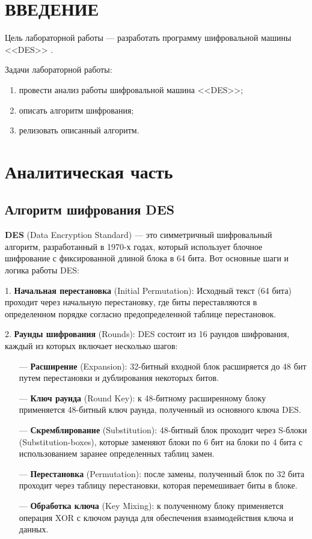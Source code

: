 \section*{\large{ВВЕДЕНИЕ}}

Цель лабораторной работы --- разработать программу шифровальной машины <<DES>> \cite{Enigma}.

Задачи лабораторной работы:

\begin{enumerate}
    \item провести анализ работы шифровальной машина <<DES>>;
    \item описать алгоритм шифрования;
    \item релизовать описанный алгоритм.
\end{enumerate}

\clearpage
\section{Аналитическая часть}

\subsection{Алгоритм шифрования DES}

\textbf{DES} (Data Encryption Standard) \cite{Enigma} --- это симметричный шифровальный алгоритм, разработанный в 1970-х годах, который использует блочное шифрование с фиксированной длиной блока в 64 бита. Вот основные шаги и логика работы DES:

1. \textbf{Начальная перестановка} (Initial Permutation):
Исходный текст (64 бита) проходит через начальную перестановку, где биты переставляются в определенном порядке согласно предопределенной таблице перестановок.

2. \textbf{Раунды шифрования} (Rounds):
DES состоит из 16 раундов шифрования, каждый из которых включает несколько шагов:
\begin{itemize}
	\item[---] \textbf{Расширение} (Expansion): 32-битный входной блок расширяется до 48 бит путем перестановки и дублирования некоторых битов.
	\item[---] \textbf{Ключ раунда} (Round Key): к 48-битному расширенному блоку применяется 48-битный ключ раунда, полученный из основного ключа DES.
	\item[---] \textbf{Скремблирование} (Substitution): 48-битный блок проходит через S-блоки (Substitution-boxes), которые заменяют блоки по 6 бит на блоки по 4 бита с использованием заранее определенных таблиц замен.
	\item[---] \textbf{Перестановка} (Permutation):  после замены, полученный блок по 32 бита проходит через таблицу перестановки, которая перемешивает биты в блоке.
	\item[---] \textbf{Обработка ключа} (Key Mixing): к полученному блоку применяется операция XOR с ключом раунда для обеспечения взаимодействия ключа и данных.
\end{itemize}

